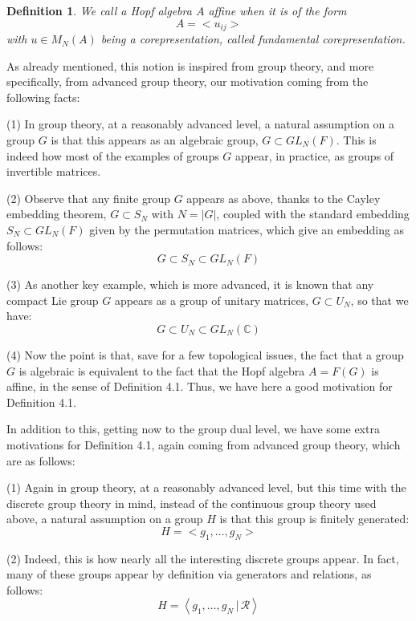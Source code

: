 \documentclass[12pt]{amsbook}
\newtheorem{definition}[theorem]{Definition}
\begin{document}

\begin{definition}
We call a Hopf algebra $A$ affine when it is of the form
$$A=<u_{ij}>$$
with $u\in M_N(A)$ being a corepresentation, called fundamental corepresentation.
\end{definition}

As already mentioned, this notion is inspired from group theory, and more specifically, from advanced group theory, our motivation coming from the following facts:

\bigskip

(1) In group theory, at a reasonably advanced level, a natural assumption on a group $G$ is that this appears as an algebraic group, $G\subset GL_N(F)$. This is indeed how most of the examples of groups $G$ appear, in practice, as groups of invertible matrices.

\bigskip

(2) Observe that any finite group $G$ appears as above, thanks to the Cayley embedding theorem, $G\subset S_N$ with $N=|G|$, coupled with the standard embedding $S_N\subset GL_N(F)$ given by the permutation matrices, which give an embedding as follows:
$$G\subset S_N\subset GL_N(F)$$

(3) As another key example, which is more advanced, it is known that any compact Lie group $G$ appears as a group of unitary matrices, $G\subset U_N$, so that we have:
$$G\subset U_N\subset GL_N(\mathbb C)$$

(4) Now the point is that, save for a few topological issues, the fact that a group $G$ is algebraic is equivalent to the fact that the Hopf algebra $A=F(G)$ is affine, in the sense of Definition 4.1. Thus, we have here a good motivation for Definition 4.1.

\bigskip

In addition to this, getting now to the group dual level, we have some extra motivations for Definition 4.1, again coming from advanced group theory, which are as follows:

\bigskip

(1) Again in group theory, at a reasonably advanced level, but this time with the discrete group theory in mind, instead of the continuous group theory used above, a natural assumption on a group $H$ is that this group is finitely generated:
$$H=<g_1,\ldots,g_N>$$

(2) Indeed, this is how nearly all the interesting discrete groups appear. In fact, many of these groups appear by definition via generators and relations, as follows:
$$H=\left<g_1,\ldots,g_N\,\Big|\,\mathcal R\right>$$
\end{document}

